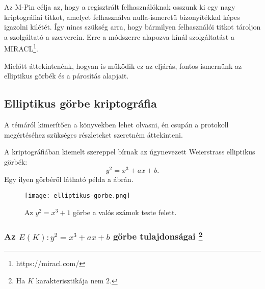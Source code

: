 Az M-Pin célja az, hogy a regisztrált felhasználóknak osszunk ki egy nagy kriptográfiai titkot, amelyet felhasználva nulla-ismeretű bizonyítékkal képes igazolni kilétét. Így nincs szükség arra, hogy bármilyen felhasználói titkot tároljon a szolgáltató a szerverein. Erre a módszerre alapozva kínál szolgáltatást a MIRACL\footnote{https://miracl.com/}.

Mielőtt áttekintenénk, hogyan is működik ez az eljárás, fontos ismernünk az elliptikus görbék és a párosítás alapjait.

\subsection{Elliptikus görbe kriptográfia}

A témáról kimerítően a \cite{ECCGuide, ECCHandbook} könyvekben lehet olvasni, én csupán a protokoll megértéséhez szükséges részleteket szeretném áttekinteni.

A kriptográfiában kiemelt szereppel bírnak az úgynevezett Weierstrass elliptikus görbék: $$y^2 = x^3 + ax + b.$$ Egy ilyen görbéről látható példa a  ábrán.

\begin{figure}[H]
    \centering
    \texttt{[image: elliptikus-gorbe.png]}
    \caption{Az $y^2 = x^3 + 1$ görbe a valós számok teste felett.}
    \label{Figure::ECC::EllipticCurve}
\end{figure}

\subsubsection{Az $E(K) : y^2 = x^3 + ax + b$ görbe tulajdonságai \protect\footnote{Ha $K$ karakterisztikája nem $2$.}}

